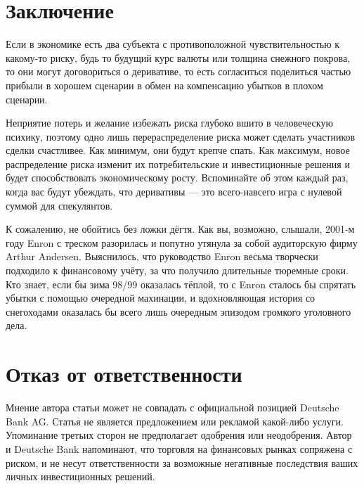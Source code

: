 \section*{Заключение}

Если в экономике есть два субъекта с противоположной чувствительностью
к какому-то риску, будь то будущий курс валюты или толщина снежного покрова, то они
могут договориться о деривативе, то есть согласиться поделиться частью прибыли
в хорошем сценарии в обмен на компенсацию убытков в плохом сценарии.

Неприятие потерь и желание избежать риска глубоко вшито в человеческую
психику, поэтому одно лишь перераспределение риска может сделать участников сделки
счастливее. Как минимум, они будут крепче спать. Как максимум, новое распределение
риска изменит их потребительские и инвестиционные решения и будет способствовать
экономическому росту. Вспоминайте об этом каждый раз, когда вас будут убеждать, что
деривативы --- это всего-навсего игра с нулевой суммой для спекулянтов.

К сожалению, не обойтись без ложки дёгтя. Как вы, возможно, слышали, 2001-м году
Enron с треском разорилась и попутно утянула за собой аудиторскую фирму Arthur
Andersen. Выяснилось, что руководство Enron весьма творчески подходило к
финансовому учёту, за что получило длительные тюремные сроки. Кто знает, если бы
зима 98/99 оказалась тёплой, то с Enron сталось бы спрятать убытки с помощью
очередной махинации, и вдохновляющая история со снегоходами оказалась бы
всего лишь очередным эпизодом громкого уголовного дела.

\section*{Отказ от ответственности}

Мнение автора статьи может не совпадать с официальной позицией Deutsche Bank AG.
Статья не является предложением или рекламой какой-либо услуги. Упоминание
третьих сторон не предполагает одобрения или неодобрения. Автор и Deutsche Bank
напоминают, что торговля на финансовых рынках сопряжена с риском, и не несут
ответственности за возможные негативные последствия ваших личных инвестиционных
решений.

\begin{otherlanguage}{english}
\printbibliography[title = \begin{otherlanguage}{russian}Список
литературы\end{otherlanguage}]
\end{otherlanguage}

\printendnotes


